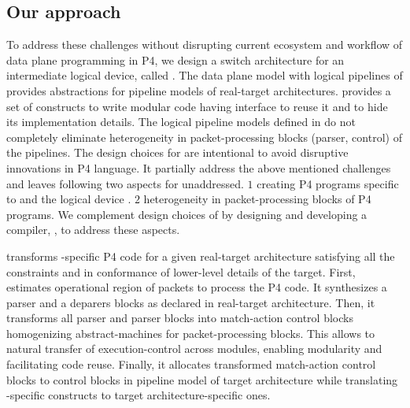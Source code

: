 \documentclass[letterpaper,twocolumn,10pt]{article}
\begin{document}
\subsection{Our approach}
\label{sec:approach}

To address these challenges without disrupting current ecosystem and
workflow of data plane programming in P4, we design a switch
architecture \uarch for an intermediate logical device, called \ucomp.
The data plane model with logical pipelines of \ucomp provides
abstractions for pipeline models of real-target architectures.  \uarch
provides a set of constructs to write modular code having interface to
reuse it and to hide its implementation details.  The logical pipeline
models defined in \uarch do not completely eliminate heterogeneity in
packet-processing blocks (parser, control) of the pipelines.
The design choices for \uarch are intentional to avoid disruptive
innovations in P4 language.  It partially address the above mentioned
challenges and leaves following two aspects for unaddressed.  $1$
creating P4 programs specific to \uarch and the logical device \ucomp.
$2$ heterogeneity in packet-processing blocks of P4 programs.  We
complement design choices of \uarch by designing and developing a
compiler, \ucomp, to address these aspects.


\ucomp transforms \uarch-specific P4 code for a given real-target
architecture satisfying all the constraints and in conformance of
lower-level details of the target.  First, \ucomp estimates
operational region of packets to process the P4 code.  It synthesizes
a parser and a deparers blocks as declared in real-target
architecture.  Then, it transforms all parser and parser blocks into
match-action control blocks homogenizing abstract-machines for
packet-processing blocks.  This allows to natural transfer of
execution-control across modules, enabling modularity and facilitating
code reuse.  Finally, it allocates transformed match-action control
blocks to control blocks in pipeline model of target architecture
while translating \uarch-specific constructs to target
architecture-specific ones.






\end{document}
